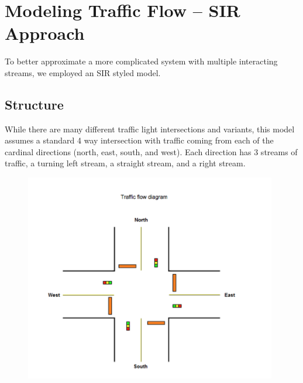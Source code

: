\documentclass[12pt]{article}
\begin{document}
    \section{Modeling Traffic Flow – SIR Approach}
    
    
    
    
    To better approximate a more complicated system with multiple interacting streams, we employed an SIR styled model. 
    
    \subsection{Structure}
    
    While there are many different traffic light intersections and variants, this model assumes a standard 4 way intersection with traffic coming from each of the cardinal directions (north, east, south, and west). Each direction has 3 streams of traffic, a turning left stream, a straight stream, and a right stream. 
    
    \begin{figure}[htp]
        \centering
        \includegraphics[width=11cm]{figures/TrafficDiagrampng.png}
        \label{fig:diagram}
    \end{figure}
    
\end{document}
